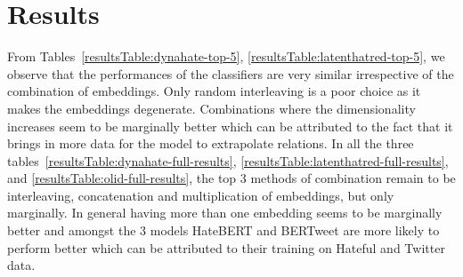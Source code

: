 \documentclass{article} %
\begin{document}
\begin{table}[t]
\scriptsize
\begin{center}
\parbox{.45\linewidth}{
}
\quad
\parbox{.45\linewidth}{
}
\end{center}
\end{table}

\section{Results}

From Tables~\ref{resultsTable:dynahate-top-5}, \ref{resultsTable:latenthatred-top-5}, we observe that the performances of the classifiers are very similar irrespective of the combination of embeddings. Only random interleaving is a poor choice as it makes the embeddings degenerate. Combinations where the dimensionality increases seem to be marginally better which can be attributed to the fact that it brings in more data for the model to extrapolate relations. In all the three tables~\ref{resultsTable:dynahate-full-results}, \ref{resultsTable:latenthatred-full-results}, and \ref{resultsTable:olid-full-results}, the top 3 methods of combination remain to be interleaving, concatenation and multiplication of embeddings, but only marginally. In general having more than one embedding seems to be marginally better and amongst the 3 models HateBERT and BERTweet are more likely to perform better which can be attributed to their training on Hateful and Twitter data.
\end{document}
